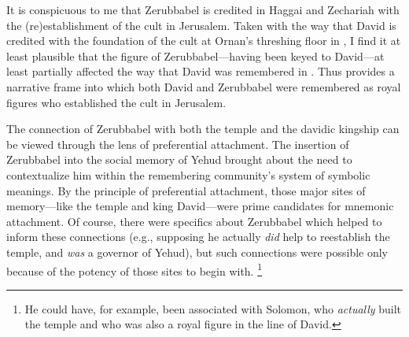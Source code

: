 It is conspicuous to me that Zerubbabel is credited in Haggai and Zechariah with the (re)establishment of the cult in Jerusalem. Taken with the way that David is credited with the foundation of the cult at Ornan's threshing floor in \chronicles, I find it at least plausible that the figure of Zerubbabel---having been keyed to David---at least partially affected the way that David was remembered in \chronicles. Thus \chronicles provides a narrative frame into which both David and Zerubbabel were remembered as royal figures who established the \yahwistic cult in Jerusalem. 

The connection of Zerubbabel with both the temple and the davidic kingship can be viewed through the lens of preferential attachment. The insertion of Zerubbabel into the social memory of Yehud brought about the need to contextualize him within the remembering community's system of symbolic meanings. By the principle of preferential attachment, those major sites of memory---like the temple and king David---were prime candidates for mnemonic attachment. Of course, there were specifics about Zerubbabel which helped to inform these connections (e.g., supposing he actually \emph{did} help to reestablish the temple, and \emph{was} a governor of Yehud), but such connections were possible only because of the potency of those sites to begin with.%
    \footnote{He could have, for example, been associated with Solomon, who \emph{actually} built the temple and who was also a royal figure in the line of David.}

